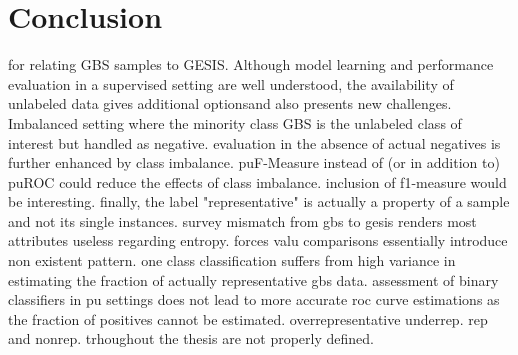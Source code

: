 \chapter{Conclusion}\label{Sec:Conclusion}

for relating GBS samples to GESIS. 
Although model learning and performance evaluation in a supervised setting are well understood, the availability of unlabeled data gives additional optionsand also presents new challenges.
Imbalanced setting where the minority class GBS is the unlabeled class of interest but handled as negative. evaluation in the absence of actual negatives is further enhanced by class imbalance. puF-Measure instead of (or in addition to) puROC could reduce the effects of class imbalance. inclusion of f1-measure would be interesting. finally, the label "representative" is actually a property of a sample and not its single instances. survey mismatch from gbs to gesis renders most attributes useless regarding entropy. forces valu comparisons essentially introduce non existent pattern. one class classification suffers from high variance in estimating the fraction of actually representative gbs data. assessment of binary classifiers in pu settings does not lead to more accurate roc curve estimations as the fraction of positives cannot be estimated. overrepresentative underrep. rep and nonrep. trhoughout the thesis are not properly defined.


